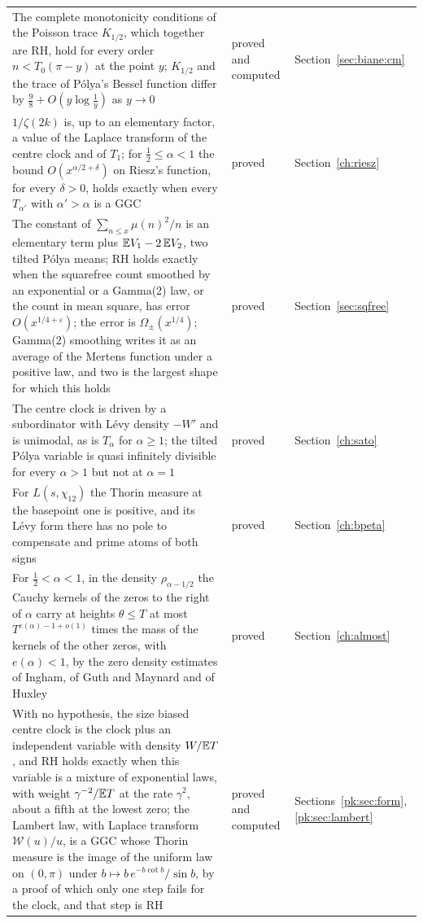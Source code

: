 {\begin{longtable}{p{}p{}p{}}
The complete monotonicity conditions of the Poisson trace $K_{1/2}$, which together are RH, hold for every order $n<T_0(\pi-y)$ at the point $y$; $K_{1/2}$ and the trace of P\'olya's Bessel function differ by $\frac98+O(y\log\frac1y)$ as $y\to0$ & \raggedright proved and computed & Section~\ref{sec:biane:cm}\\
$1/\zeta(2k)$ is, up to an elementary factor, a value of the Laplace transform of the centre clock and of $T_1$; for $\frac12\le\alpha<1$ the bound $O(x^{\alpha/2+\delta})$ on Riesz's function, for every $\delta>0$, holds exactly when every $T_{\alpha'}$ with $\alpha'>\alpha$ is a GGC & \raggedright proved & Section~\ref{ch:riesz}\\
The constant of $\sum_{n\le x}\mu(n)^2/n$ is an elementary term plus $\mathbb{E} V_1-2\,\mathbb{E} V_2$, two tilted P\'olya means; RH holds exactly when the squarefree count smoothed by an exponential or a Gamma(2) law, or the count in mean square, has error $O(x^{1/4+\varepsilon})$; the error is $\Omega_\pm(x^{1/4})$; Gamma(2) smoothing writes it as an average of the Mertens function under a positive law, and two is the largest shape for which this holds & \raggedright proved & Section~\ref{sec:sqfree}\\
The centre clock is driven by a subordinator with L\'evy density $-W'$ and is unimodal, as is $T_\alpha$ for $\alpha\ge1$; the tilted P\'olya variable is quasi infinitely divisible for every $\alpha>1$ but not at $\alpha=1$ & \raggedright proved & Section~\ref{ch:sato}\\
For $L(s,\chi_{12})$ the Thorin measure at the basepoint one is positive, and its L\'evy form there has no pole to compensate and prime atoms of both signs & \raggedright proved & Section~\ref{ch:bpeta}\\
For $\frac12<\alpha<1$, in the density $\rho_{\alpha-1/2}$ the Cauchy kernels of the zeros to the right of $\alpha$ carry at heights $\theta\le T$ at most $T^{e(\alpha)-1+o(1)}$ times the mass of the kernels of the other zeros, with $e(\alpha)<1$, by the zero density estimates of Ingham, of Guth and Maynard and of Huxley \cite{Ingham40,GM26,Huxley72} & \raggedright proved & Section~\ref{ch:almost}\\
With no hypothesis, the size biased centre clock is the clock plus an independent variable with density $W/\mathbb{E} T$, and RH holds exactly when this variable is a mixture of exponential laws, with weight $\gamma^{-2}/\mathbb{E} T$ at the rate $\gamma^2$, about a fifth at the lowest zero; the Lambert law, with Laplace transform $\mathcal W(u)/u$, is a GGC whose Thorin measure is the image of the uniform law on $(0,\pi)$ under $b\mapsto b\,e^{-b\cot b}/\sin b$, by a proof of which only one step fails for the clock, and that step is RH & \raggedright proved and computed & Sections~\ref{pk:sec:form}, \ref{pk:sec:lambert}\\

\end{longtable}}
